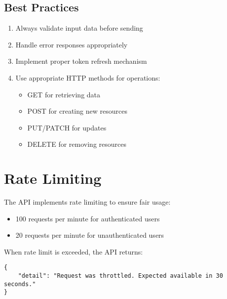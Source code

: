 \documentclass[11pt,a4paper]{article}
\begin{document}
\subsection{Best Practices}
\begin{enumerate}
    \item Always validate input data before sending
    \item Handle error responses appropriately
    \item Implement proper token refresh mechanism
    \item Use appropriate HTTP methods for operations:
    \begin{itemize}
        \item GET for retrieving data
        \item POST for creating new resources
        \item PUT/PATCH for updates
        \item DELETE for removing resources
    \end{itemize}
\end{enumerate}

\section{Rate Limiting}

The API implements rate limiting to ensure fair usage:
\begin{itemize}
    \item 100 requests per minute for authenticated users
    \item 20 requests per minute for unauthenticated users
\end{itemize}

When rate limit is exceeded, the API returns:
\begin{lstlisting}[style=json]
{
    "detail": "Request was throttled. Expected available in 30 seconds."
}
\end{lstlisting}
\end{document}
